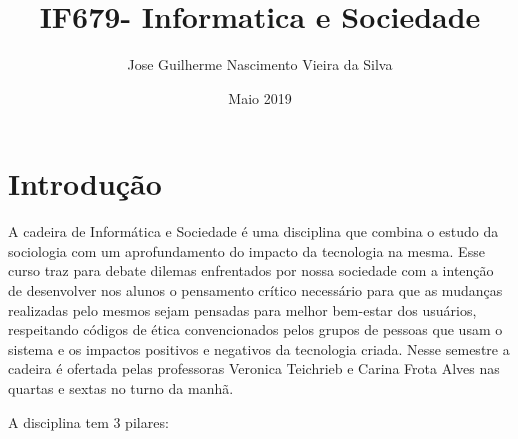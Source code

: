 \documentclass[10pt]{article}
\title{IF679- Informatica e Sociedade}
\author{Jose Guilherme Nascimento Vieira da Silva}
\date{Maio 2019}
\begin{document}
\maketitle

\section{Introdução}
A cadeira de Informática e Sociedade é uma disciplina que combina o estudo da sociologia com um aprofundamento do impacto da tecnologia na mesma. Esse curso traz para debate dilemas
enfrentados por nossa sociedade com a intenção de desenvolver nos alunos o pensamento crítico necessário para que as mudanças realizadas pelo mesmos sejam pensadas para melhor bem-estar dos usuários, respeitando códigos de ética convencionados pelos grupos de pessoas que usam o sistema e os impactos positivos e negativos da tecnologia criada. Nesse semestre a cadeira é ofertada pelas professoras Veronica
Teichrieb
e Carina Frota Alves nas quartas e sextas no turno da manhã.

A disciplina tem 3 pilares:
\end{document}
